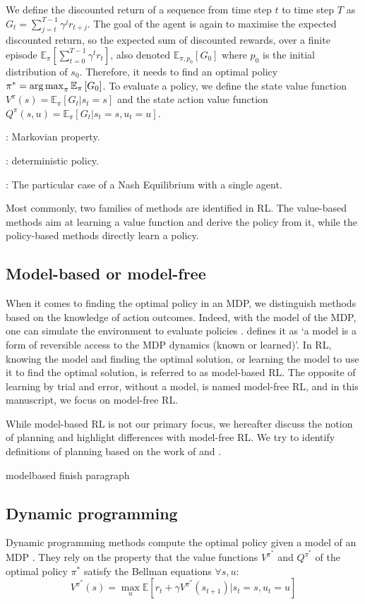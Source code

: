We define the discounted return of a sequence from time step $t$ to time step $T$ as $G_t= \sum_{j=t}^{T-1} \gamma^j r_{t+j}$.
The goal of the agent is again to maximise the expected discounted return, so the expected sum of discounted rewards, over a finite episode $\mathbb{E}_{\pi} \left[\sum_{t=0}^{T-1} \gamma^t r_t \right]$, also denoted $\mathbb{E}_{\pi, p_0}\left[ G_0 \right]$ where $p_0$ is the initial distribution of $s_0$.
Therefore, it needs to find an optimal policy $\pi^*=\operatorname*{arg\,max}_\pi \mathbb{E}_{\pi}\left[ G_0 \right]$.
To evaluate a policy, we define the state value function $V^\pi(s) = \mathbb{E}_{\pi}\left[G_t|s_t=s\right]$ and the state action value function $Q^\pi(s, u) = \mathbb{E}_{\pi}\left[G_t|s_t=s, u_t=u\right]$.

\todo: Markovian property.

\todo: deterministic policy.

\todo: The particular case of a Nash Equilibrium with a single agent.

Most commonly, two families of methods are identified in RL.
The value-based methods aim at learning a value function and derive the policy from it, while the policy-based methods directly learn a policy.

\subsection{Model-based or model-free}
\label{sec:ch2_model_based_vs_model_free}
When it comes to finding the optimal policy in an MDP, we distinguish methods based on the knowledge of action outcomes.
Indeed, with the model of the MDP, one can simulate the environment to evaluate policies \citep{sutton2018reinforcement}.
\cite{moerland2023model} defines it as `a model is a form of reversible access to the MDP dynamics (known or learned)'.
In RL, knowing the model and finding the optimal solution, or learning the model to use it to find the optimal solution, is referred to as model-based RL.
The opposite of learning by trial and error, without a model, is named model-free RL, and in this manuscript, we focus on model-free RL.

While model-based RL is not our primary focus, we hereafter discuss the notion of planning and highlight differences with model-free RL.
We try to identify definitions of planning based on the work of \cite{moerland2023model} and \cite{sutton2018reinforcement}.

\todo modelbased finish paragraph

\subsection{Dynamic programming}
Dynamic programming \citep{bellman1966dynamic} methods compute the optimal policy given a model of an MDP \citep{sutton2018reinforcement}.
They rely on the property that the value functions $V^{\pi^*}$ and $Q^{\pi^*}$ of the optimal policy ${\pi^*}$ satisfy the Bellman equations $\forall s, u$:
\begin{equation}
\label{eq:ch2_bellmanV}
    V^{\pi^*}(s) = \max_u \mathbb{E}[r_t + \gamma V^{\pi^*}(s_{t+1})| s_t=s, u_t=u]
\end{equation}

